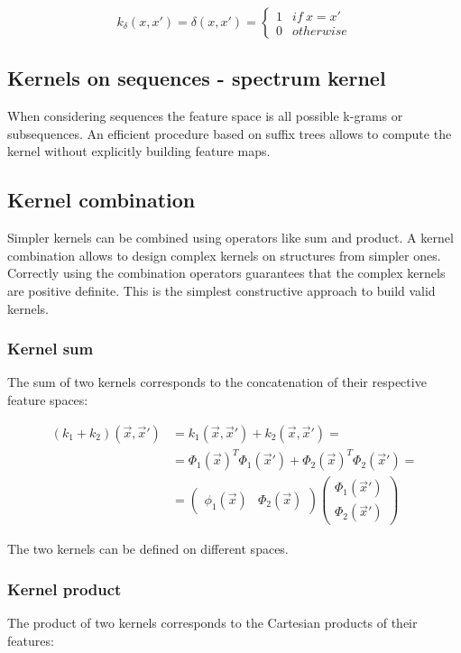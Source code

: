 		$$k_\delta(x,x') = \delta(x,x') = \begin{cases}1 &if\ x = x'\\0 &otherwise\end{cases}$$

	\subsection{Kernels on sequences - spectrum kernel}
	When considering sequences the feature space is all possible k-grams or subsequences.
	An efficient procedure based on suffix trees allows to compute the kernel without explicitly building feature maps.

	\subsection{Kernel combination}
	Simpler kernels can be combined using operators like sum and product.
	A kernel combination allows to design complex kernels on structures from simpler ones.
	Correctly using the combination operators guarantees that the complex kernels are positive definite.
	This is the simplest constructive approach to build valid kernels.

		\subsubsection{Kernel sum}
		The sum of two kernels corresponds to the concatenation of their respective feature spaces:

		\begin{align*}
			(k_1+k_2)(\vec{x},\vec{x}') &=k_1(\vec{x},\vec{x}')+k_2(\vec{x},\vec{x}')=\\
																	&=\Phi_1(\vec{x})^T\Phi_1(\vec{x}') + \Phi_2(\vec{x})^T\Phi_2(\vec{x}')=\\
																	&=\begin{pmatrix}\phi_1(\vec{x})&\Phi_2(\vec{x})\end{pmatrix}\begin{pmatrix}\Phi_1(\vec{x}')\\\Phi_2(\vec{x}')\end{pmatrix}
		\end{align*}

		The two kernels can be defined on different spaces.

		\subsubsection{Kernel product}
		The product of two kernels corresponds to the Cartesian products of their features:

